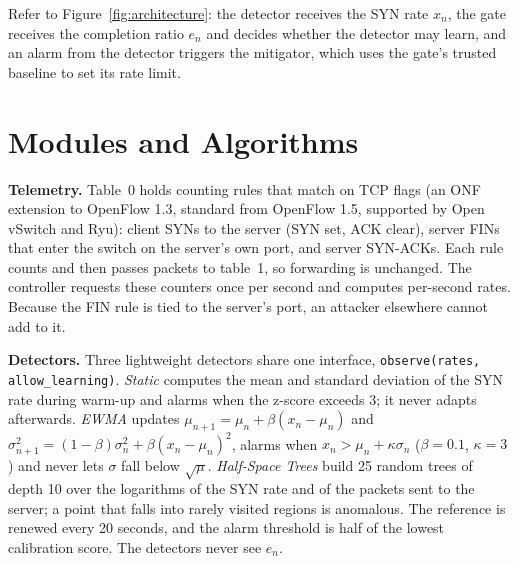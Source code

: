 \documentclass[12pt,a4paper,oneside]{report}
\begin{document}
Refer to Figure~\ref{fig:architecture}: the detector receives the SYN rate $x_n$, the gate receives the completion ratio $e_n$ and decides whether the detector may learn, and an alarm from the detector triggers the mitigator, which uses the gate's trusted baseline to set its rate limit.

\section{Modules and Algorithms}
\textbf{Telemetry.} Table~0 holds counting rules that match on TCP flags (an ONF extension to OpenFlow 1.3, standard from OpenFlow 1.5, supported by Open vSwitch and Ryu): client SYNs to the server (SYN set, ACK clear), server FINs that enter the switch on the server's own port, and server SYN-ACKs. Each rule counts and then passes packets to table~1, so forwarding is unchanged. The controller requests these counters once per second and computes per-second rates. Because the FIN rule is tied to the server's port, an attacker elsewhere cannot add to it.

\textbf{Detectors.} Three lightweight detectors share one interface, \texttt{observe(rates, allow\_learning)}. \emph{Static} computes the mean and standard deviation of the SYN rate during warm-up and alarms when the z-score exceeds 3; it never adapts afterwards. \emph{EWMA} updates $\mu_{n+1} = \mu_n + \beta(x_n-\mu_n)$ and $\sigma^2_{n+1} = (1-\beta)\sigma^2_n + \beta(x_n-\mu_n)^2$, alarms when $x_n > \mu_n + \kappa\sigma_n$ ($\beta=0.1$, $\kappa=3$) and never lets $\sigma$ fall below $\sqrt{\mu}$. \emph{Half-Space Trees} \citep{tan2011hst} build 25 random trees of depth 10 over the logarithms of the SYN rate and of the packets sent to the server; a point that falls into rarely visited regions is anomalous. The reference is renewed every 20 seconds, and the alarm threshold is half of the lowest calibration score. The detectors never see $e_n$.
\end{document}
